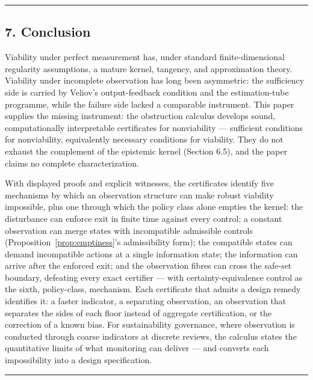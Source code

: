 \documentclass[11pt]{article}
\theoremstyle{definition}
\begin{document}
\begin{center}\rule{0.5\linewidth}{0.5pt}\end{center}

\subsection{7. Conclusion}\label{conclusion}

Viability under perfect measurement has, under standard
finite-dimensional regularity assumptions, a mature kernel, tangency,
and approximation theory. Viability under incomplete observation has
long been asymmetric: the sufficiency side is carried by Veliov's
output-feedback condition and the estimation-tube programme, while the
failure side lacked a comparable instrument. This paper supplies the missing instrument: the obstruction calculus develops sound, computationally interpretable certificates for nonviability --- sufficient conditions for nonviability, equivalently necessary conditions for viability. They do not exhaust the complement of the epistemic kernel (Section 6.5), and the paper claims no complete characterization.

With displayed proofs and explicit witnesses, the certificates identify
five mechanisms by which an observation structure can make robust
viability impossible, plus one through which the policy class alone
empties the kernel: the disturbance can enforce exit in finite time
against every control; a constant observation can merge states with
incompatible admissible controls (Proposition~\ref{prop:emptiness}'s admissibility form);
the compatible states can demand incompatible actions at a single
information state; the information can arrive after the enforced exit;
and the observation fibres can cross the safe-set boundary, defeating
every exact certifier --- with certainty-equivalence control as the
sixth, policy-class, mechanism. Each certificate that admits a design
remedy identifies it: a faster indicator, a separating observation, an
observation that separates the sides of each floor instead of aggregate
certification, or the correction of a known bias. For sustainability
governance, where observation is conducted through coarse indicators at
discrete reviews, the calculus states the quantitative limits of what
monitoring can deliver --- and converts each impossibility into a design
specification.

\begin{center}\rule{0.5\linewidth}{0.5pt}\end{center}
\end{document}
